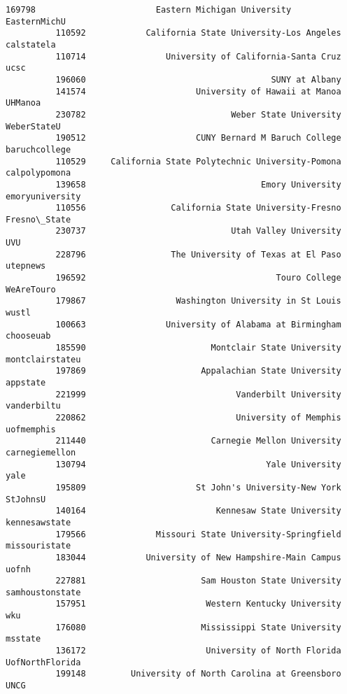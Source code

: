 \documentclass[11pt]{article}
\begin{document}
\begin{Verbatim}[commandchars=\\\{\}]
          169798                        Eastern Michigan University     EasternMichU   
          110592            California State University-Los Angeles       calstatela   
          110714                University of California-Santa Cruz             ucsc   
          196060                                     SUNY at Albany                    
          141574                      University of Hawaii at Manoa          UHManoa   
          230782                             Weber State University      WeberStateU   
          190512                      CUNY Bernard M Baruch College    baruchcollege   
          110529     California State Polytechnic University-Pomona    calpolypomona   
          139658                                   Emory University  emoryuniversity   
          110556                 California State University-Fresno     Fresno\_State   
          230737                             Utah Valley University              UVU   
          228796                 The University of Texas at El Paso        utepnews    
          196592                                      Touro College       WeAreTouro   
          179867                  Washington University in St Louis            wustl   
          100663                University of Alabama at Birmingham        chooseuab   
          185590                         Montclair State University  montclairstateu   
          197869                       Appalachian State University         appstate   
          221999                              Vanderbilt University      vanderbiltu   
          220862                              University of Memphis       uofmemphis   
          211440                         Carnegie Mellon University   carnegiemellon   
          130794                                    Yale University             yale   
          195809                      St John's University-New York         StJohnsU   
          140164                          Kennesaw State University    kennesawstate   
          179566              Missouri State University-Springfield    missouristate   
          183044            University of New Hampshire-Main Campus            uofnh   
          227881                       Sam Houston State University  samhoustonstate   
          157951                        Western Kentucky University              wku   
          176080                       Mississippi State University          msstate   
          136172                        University of North Florida  UofNorthFlorida   
          199148         University of North Carolina at Greensboro             UNCG   

\end{Verbatim}
\end{document}
